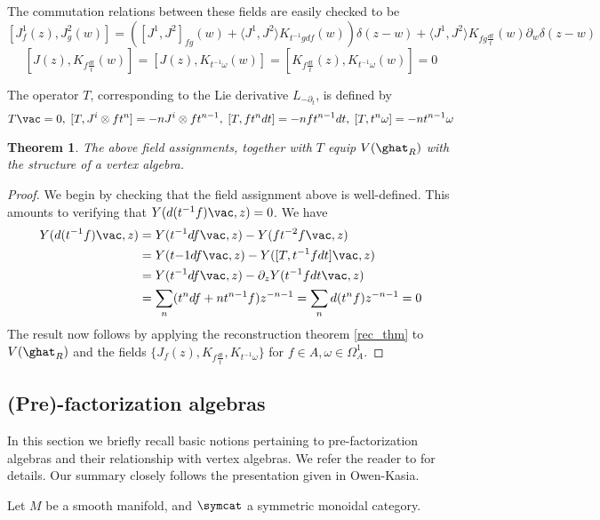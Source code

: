 \documentclass[12pt]{amsart}
\newtheorem{theorem}{Theorem}[section]
\theoremstyle{definition}
\theoremstyle{remark}
\newcommand{\R}{R}
\begin{document}
The commutation relations between these fields are easily checked to be
$$
[J^1_f (z), J^2_g (w)] = \left( [J^1, J^2]_{fg} (w) + \langle J^1, J^2 \rangle  K_{t^{-1} g df} (w)      \right) \delta(z-w) + \langle J^1, J^2 \rangle K_{fg \frac{dt}{t}} (w) \partial_w \delta(z-w)
$$
$$
[J(z), K_{f \frac{dt}{t}}(w) ] = [J(z), K_{t^{-1} \omega} (w)] = [ K_{f \frac{dt}{t}}(z),  K_{t^{-1} \omega} (w)] =0
$$

The operator $T$, corresponding to the Lie derivative $L_{-\partial_t}$, is defined by
\[
T \vac =0, \; [T, J^i \otimes f t^n] = -n J^i \otimes f t^{n-1}, \; [T, f t^n dt] = -n f t^{n-1} dt, \; [T, t^n \omega] = -n t^{n-1} \omega
\]

\begin{theorem}
The above field assignments, together with $T$ equip $V(\ghat_{\R})$ with the structure of a vertex algebra.
\end{theorem}

\begin{proof}
We begin by checking that the field assignment above is well-defined. This amounts to verifying that $Y(d(t^{-1}f)\vac,z ) =0$.  We have 
\begin{align*}
Y(d(t^{-1}f) \vac, z) &= Y(t^{-1} df \vac, z) - Y(f t^{-2} f \vac, z) \\
&= Y(t{-1} df \vac, z) - Y([T, t^{-1}f dt  ] \vac, z) \\
&= Y(t^{-1} df \vac, z) - \partial_z Y( t^{-1} f dt \vac, z) \\
&= \sum_{n} (t^n df + n t^{n-1} f) z^{-n-1} = \sum_{n} d(t^n f) z^{-n-1} = 0
\end{align*}
The result now follows by applying the reconstruction theorem \ref{rec_thm} to $V(\ghat_\R)$ and the fields $\{ J_f (z), K_{f \frac{dt}{t}}, K_{t^{-1} \omega} \}$ for $f \in A, \omega \in \Omega^{1}_A $.
\end{proof}

\subsection{(Pre)-factorization algebras}

In this section we briefly recall basic notions pertaining to pre-factorization algebras and their relationship with vertex algebras. We refer the reader to \cite{CG} for details. Our summary closely follows the presentation given in \cite{} {\color{red} Owen-Kasia}. 

Let $M$ be a smooth manifold, and $\symcat$ a symmetric monoidal category. 
\end{document}
